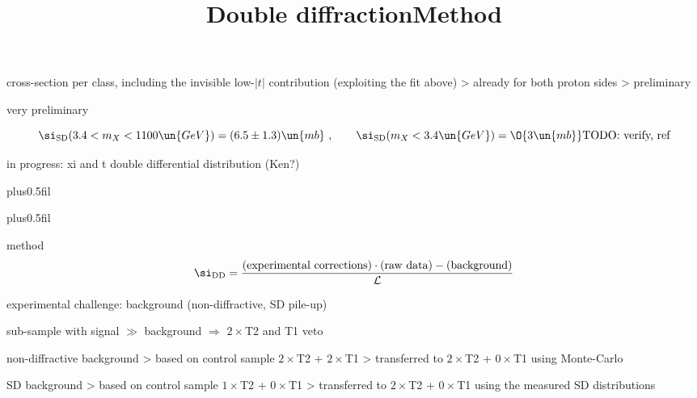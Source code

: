 \> cross-section per class, including the invisible low-$|t|$ contribution (exploiting the fit above)
\>> already for both proton sides
\>> preliminary

\centerline{}

\> very preliminary

$$\si_{\rm SD}(3.4 < m_X < 1100\un{GeV}) = (6.5 \pm 1.3)\un{mb}\ ,\qquad \si_{\rm SD}(m_X < 3.4\un{GeV}) = \O{3\un{mb}} \hbox{TODO: verify, ref}$$

\> in progress: xi and t double differential distribution (Ken?)

\newpage %
\hbox{}
\vfil
\title{Double diffraction}

\vskip0pt plus0.5fil

\vskip0pt plus0.5fil

\newpage %
\title{Method}

\vskip-3mm

\> method
$$\si_{\rm DD} = {\hbox{(experimental corrections)}\cdot\hbox{(raw data)} - \hbox{(background)}\over {\cal L}}$$

\> experimental challenge: background (non-diffractive, SD pile-up)


\centerline{\cYe sub-sample with signal $\gg$ background $\Rightarrow$  $2\times$T2 and T1 veto\cFg}


\> non-diffractive background
\>> based on control sample $2\times$T2 + $2\times$T1
\>> transferred to $2\times$T2 + $0\times$T1 using Monte-Carlo

\> SD background
\>> based on control sample $1\times$T2 + $0\times$T1
\>> transferred to $2\times$T2 + $0\times$T1 using the measured SD distributions


